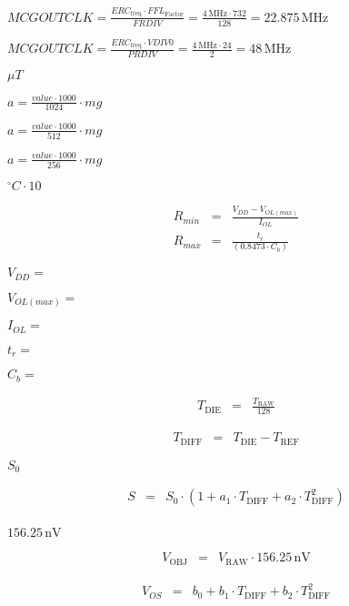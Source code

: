 \documentclass{article}
\begin{document}
$MCGOUTCLK = \frac{ERC_{\mathrm{freq}}\cdot FFL_{\mathrm{Factor}}}{FRDIV} = \frac{4\,\mathrm{MHz}\cdot 732}{128} = 22.875\,\mathrm{MHz}$
\pagebreak

$MCGOUTCLK = \frac{ERC_{\mathrm{freq}}\cdot VDIV0}{PRDIV} = \frac{4\,\mathrm{MHz}\cdot 24}{2} = 48\,\mathrm{MHz}$
\pagebreak

$\mu T$
\pagebreak

$ a = \frac{value \cdot 1000}{1024} \cdot mg $
\pagebreak

$ a = \frac{value \cdot 1000}{512} \cdot mg $
\pagebreak

$ a = \frac{value \cdot 1000}{256} \cdot mg $
\pagebreak

$^\circ C \cdot 10$
\pagebreak

\begin{eqnarray*} R_{min} &=& \frac{V_{DD} - V_{OL(max)}} {I_{OL}}\\ R_{max} &=& \frac{t_r} {(0.8473 \cdot C_b)} \end{eqnarray*}
\pagebreak

$ V_{DD} =$
\pagebreak

$ V_{OL(max)} =$
\pagebreak

$ I_{OL} =$
\pagebreak

$ t_r =$
\pagebreak

$ C_b =$
\pagebreak

\begin{eqnarray*} T_{\mathrm{DIE}} &=& \frac{T_{\mathrm{RAW}}}{128} \end{eqnarray*}
\pagebreak

\begin{eqnarray*} T_{\mathrm{DIFF}} &=& T_{\mathrm{DIE}} - T_{\mathrm{REF}} \end{eqnarray*}
\pagebreak

$S_{\mathrm{0}}$
\pagebreak

\begin{eqnarray*} S &=& S_{\mathrm{0}} \cdot ( 1 + a_1 \cdot T_{\mathrm{DIFF}} + a_2 \cdot T_{\mathrm{DIFF}}^2 ) \\ \end{eqnarray*}
\pagebreak

$ 156.25\,\mathrm{nV} $
\pagebreak

\begin{eqnarray*} V_{\mathrm{OBJ}} &=& V_{\mathrm{RAW}} \cdot 156.25\,\mathrm{nV} \end{eqnarray*}
\pagebreak

\begin{eqnarray*} V_{OS} &=& b_0 + b_1 \cdot T_{\mathrm{DIFF}} + b_2 \cdot T_{\mathrm{DIFF}}^2 \\ \end{eqnarray*}
\pagebreak
\end{document}

